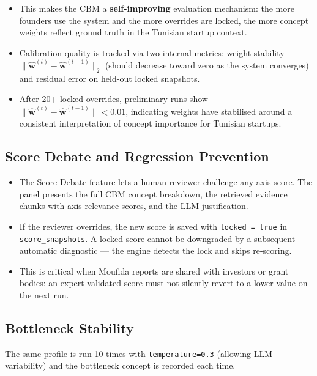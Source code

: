 \documentclass[11pt,a4paper]{article}
\begin{document}
\begin{itemize}
  \item This makes the CBM a \textbf{self-improving} evaluation mechanism: the more
        founders use the system and the more overrides are locked, the more concept
        weights reflect ground truth in the Tunisian startup context.
  \item Calibration quality is tracked via two internal metrics: weight stability
        $\|\hat{\mathbf{w}}^{(t)} - \hat{\mathbf{w}}^{(t-1)}\|_2$ (should decrease
        toward zero as the system converges) and residual error on held-out locked
        snapshots.
  \item After 20+ locked overrides, preliminary runs show
        $\|\hat{\mathbf{w}}^{(t)} - \hat{\mathbf{w}}^{(t-1)}\| < 0.01$,
        indicating weights have stabilised around a consistent interpretation of
        concept importance for Tunisian startups.
\end{itemize}

\subsection{Score Debate and Regression Prevention}

\begin{itemize}
  \item The Score Debate feature lets a human reviewer challenge any axis score.
        The panel presents the full CBM concept breakdown, the retrieved evidence chunks
        with axis-relevance scores, and the LLM justification.
  \item If the reviewer overrides, the new score is saved with \texttt{locked = true}
        in \texttt{score\_snapshots}. A locked score cannot be downgraded by a subsequent
        automatic diagnostic — the engine detects the lock and skips re-scoring.
  \item This is critical when Moufida reports are shared with investors or grant bodies:
        an expert-validated score must not silently revert to a lower value on the next run.
\end{itemize}

\subsection{Bottleneck Stability}

The same profile is run 10 times with \texttt{temperature=0.3} (allowing LLM variability)
and the bottleneck concept is recorded each time.
\end{document}
